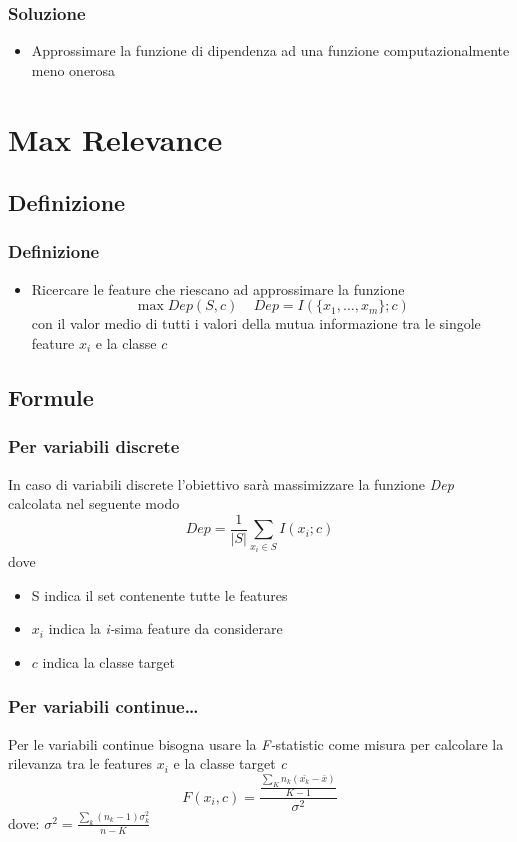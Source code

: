 \documentclass{beamer}
\begin{document}
\begin{frame}
	\frametitle{Soluzione}
	\begin{itemize}
		\item Approssimare la funzione di dipendenza ad una funzione computazionalmente meno onerosa
	\end{itemize}
\end{frame}


\section{Max Relevance}
\subsection{Definizione}
\begin{frame}
	\frametitle{Definizione}
	\begin{itemize}
		\item Ricercare le feature che riescano ad approssimare la funzione 	$$ \max Dep(S,c)~~~~~ Dep = I(\{x_1,\dots,x_m \};c )$$
		con il valor medio di tutti i valori della mutua informazione tra le singole feature $x_i$ e la classe $c$
	\end{itemize}
\end{frame}
\subsection{Formule}
\begin{frame}
	\frametitle{Per variabili discrete}
	In caso di variabili discrete l'obiettivo sarà massimizzare la funzione \emph{Dep} calcolata nel seguente modo
	$$Dep= \frac{1}{|S|} \sum\limits_{x_i \in S} I (x_i;c)$$
	dove 
	\begin{itemize}
		\item S indica il set contenente tutte le features
		\item $x_i$ indica la \emph{i-}sima feature da considerare
		\item $c$ indica la classe target
	\end{itemize}
\end{frame}

\begin{frame}
	\frametitle{Per variabili continue\dots}
	Per le variabili continue bisogna usare la \emph{F-}statistic come misura per calcolare la rilevanza tra le features $x_i$ e la classe target \emph{c}
	$$ F(x_i,c) = \frac{\frac{\sum\limits_{K}{n_k(\bar{x_k}-\bar{x})}}{K-1}}{\sigma^2}$$
	dove: $\sigma^2=\frac{ \sum\limits_{k}{(n_k-1)\sigma^2_k}}{n-K}$
	
	
	


\end{frame}
\end{document}
